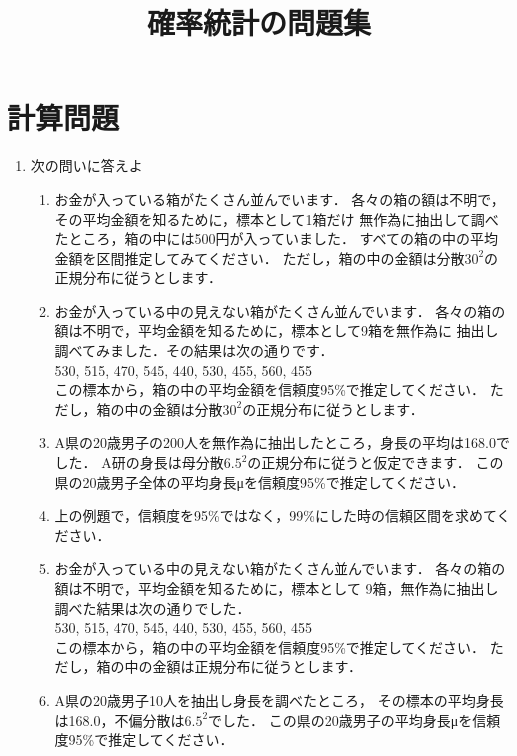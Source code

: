 \documentclass[12pt]{ltjsarticle}
\begin{document}
\title{\vspace{-5mm}確率統計の問題集}
\maketitle
\section{計算問題}
\begin{enumerate}
\item 次の問いに答えよ
\begin{enumerate}
\item
お金が入っている箱がたくさん並んでいます．
各々の箱の額は不明で，その平均金額を知るために，標本として1箱だけ
無作為に抽出して調べたところ，箱の中には500円が入っていました．
すべての箱の中の平均金額を区間推定してみてください．
ただし，箱の中の金額は分散$30^2$の正規分布に従うとします．
\cite[p.122]{wakui}
\item
お金が入っている中の見えない箱がたくさん並んでいます．
各々の箱の額は不明で，平均金額を知るために，標本として9箱を無作為に
抽出し調べてみました．その結果は次の通りです．\\
\hspace{1cm} 530, 515, 470, 545, 440, 530, 455, 560, 455 \\
この標本から，箱の中の平均金額を信頼度95\%で推定してください．
ただし，箱の中の金額は分散$30^2$の正規分布に従うとします．
\cite[p.127]{wakui}
\item
A県の20歳男子の200人を無作為に抽出したところ，身長の平均は168.0でした．
A研の身長は母分散$6.5^2$の正規分布に従うと仮定できます．
この県の20歳男子全体の平均身長μを信頼度95\%で推定してください．
\cite[p.131]{wakui}
\item
上の例題で，信頼度を95\%ではなく，99\%にした時の信頼区間を求めてください．
\cite[p.131]{wakui}
\item
お金が入っている中の見えない箱がたくさん並んでいます．
各々の箱の額は不明で，平均金額を知るために，標本として
9箱，無作為に抽出し調べた結果は次の通りでした．\\
\hspace{1cm} 530, 515, 470, 545, 440, 530, 455, 560, 455 \\
この標本から，箱の中の平均金額を信頼度95\%で推定してください．
ただし，箱の中の金額は正規分布に従うとします．
\cite[p.132]{wakui}
\item
A県の20歳男子10人を抽出し身長を調べたところ，
その標本の平均身長は168.0，不偏分散は$6.5^2$でした．
この県の20歳男子の平均身長μを信頼度95\%で推定してください．

\end{enumerate}
\end{enumerate}
\end{document}
